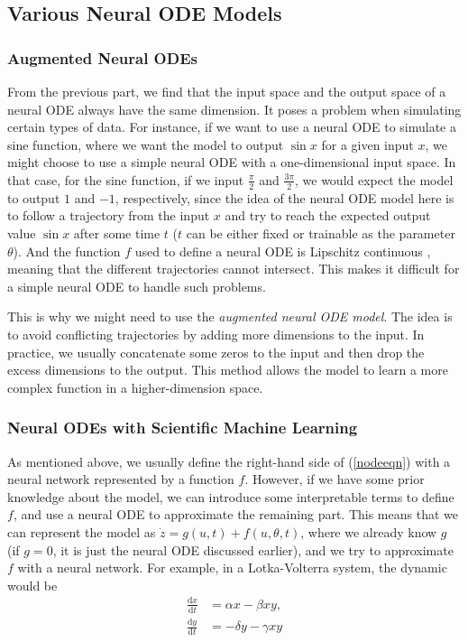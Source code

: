 \documentclass[a4paper,11pt,titlepage]{article}
\theoremstyle{definition}
\theoremstyle{plain}
\theoremstyle{remark}
\begin{document}
\subsection{Various Neural ODE Models}

\subsubsection{Augmented Neural ODEs}

From the previous part, we find that the input space and the output space of a neural ODE always have the same dimension. It poses a problem when simulating certain types of data. For instance, if we want to use a neural ODE to simulate a sine function, where we want the model to output $\sin x$ for a given input $x$, we might choose to use a simple neural ODE with a one-dimensional input space. In that case, for the sine function, if we input $\frac{\pi}{2}$ and $\frac{3\pi}{2}$, we would expect the model to output $1$ and $-1$, respectively, since the idea of the neural ODE model here is to follow a trajectory from the input $x$ and try to reach the expected output value $\sin x$ after some time $t$ ($t$ can be either fixed or trainable as the parameter $\theta$). And the function $f$ used to define a neural ODE is Lipschitz continuous \cite{chen2018neural}, meaning that the different trajectories cannot intersect. This makes it difficult for a simple neural ODE to handle such problems.

This is why we might need to use the \textit{augmented neural ODE model}. The idea is to avoid conflicting trajectories by adding more dimensions to the input. In practice, we usually concatenate some zeros to the input and then drop the excess dimensions to the output. This method allows the model to learn a more complex function in a higher-dimension space.

\subsubsection{Neural ODEs with Scientific Machine Learning}

As mentioned above, we usually define the right-hand side of (\ref{nodeeqn}) with a neural network represented by a function $f$. However, if we have some prior knowledge about the model, we can introduce some interpretable terms to define $f$, and use a neural ODE to approximate the remaining part. This means that we can represent the model as $\dot{z}=g(u,t)+f(u,\theta,t)$, where we already know $g$ (if $g=0$, it is just the neural ODE discussed earlier), and we try to approximate $f$ with a neural network. For example, in a Lotka-Volterra system, the dynamic would be
\begin{align*}
    \frac{\mathrm{d}x}{\mathrm{d}t}&=\alpha x-\beta xy,\\
    \frac{\mathrm{d}y}{\mathrm{d}t}&=-\delta y-\gamma xy
\end{align*}
\end{document}
